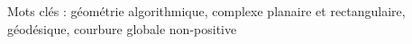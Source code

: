 \lipsum[1]

\vspace{0.5cm}
Mots clés : géométrie algorithmique, complexe planaire et rectangulaire, géodésique, courbure globale non-positive